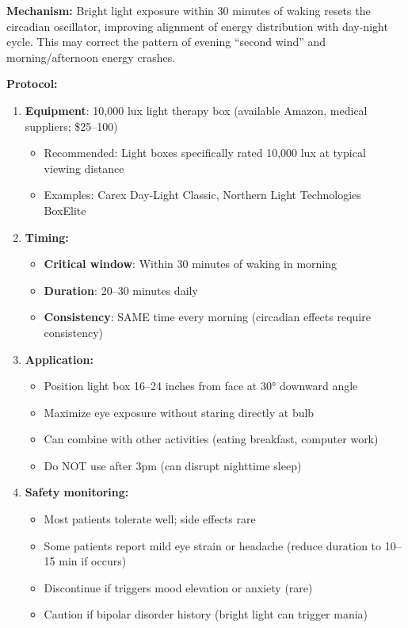 \begin{recommendation}
\label{rec:circadian-light-severe}

\textbf{Mechanism:} Bright light exposure within 30 minutes of waking resets the circadian oscillator, improving alignment of energy distribution with day-night cycle. This may correct the pattern of evening ``second wind'' and morning/afternoon energy crashes.

\textbf{Protocol:}

\begin{enumerate}
    \item \textbf{Equipment}: 10,000 lux light therapy box (available Amazon, medical suppliers; \$25--100)
    \begin{itemize}
        \item Recommended: Light boxes specifically rated 10,000 lux at typical viewing distance
        \item Examples: Carex Day-Light Classic, Northern Light Technologies BoxElite
    \end{itemize}

    \item \textbf{Timing:}
    \begin{itemize}
        \item \textbf{Critical window}: Within 30 minutes of waking in morning
        \item \textbf{Duration}: 20--30 minutes daily
        \item \textbf{Consistency}: SAME time every morning (circadian effects require consistency)
    \end{itemize}

    \item \textbf{Application:}
    \begin{itemize}
        \item Position light box 16--24 inches from face at 30° downward angle
        \item Maximize eye exposure without staring directly at bulb
        \item Can combine with other activities (eating breakfast, computer work)
        \item Do NOT use after 3pm (can disrupt nighttime sleep)
    \end{itemize}

    \item \textbf{Safety monitoring:}
    \begin{itemize}
        \item Most patients tolerate well; side effects rare
        \item Some patients report mild eye strain or headache (reduce duration to 10--15 min if occurs)
        \item Discontinue if triggers mood elevation or anxiety (rare)
        \item Caution if bipolar disorder history (bright light can trigger mania)
    \end{itemize}


\end{enumerate}
\end{recommendation}
